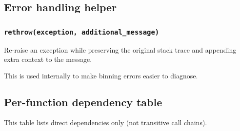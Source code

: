 \documentclass[11pt]{article}
\begin{document}
\subsection{Error handling helper}

\subsubsection{\texttt{rethrow(exception, additional\_message)}}
Re-raise an exception while preserving the original stack trace and appending extra context to the message.

This is used internally to make binning errors easier to diagnose.

\subsection{Per-function dependency table}

This table lists direct dependencies only (not transitive call chains).
\end{document}
